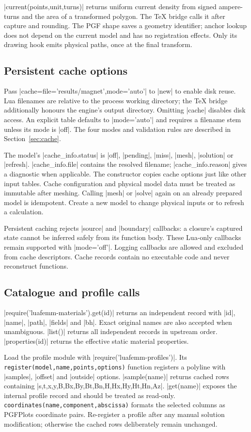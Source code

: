 |current(points,unit,turns)| returns uniform current density from signed
ampere-turns and the area of a transformed polygon. The TeX bridge calls it
after capture and rounding. The PGF shape saves a geometry identifier; anchor
lookup does not depend on the current model and has no registration effects.
Only its drawing hook emits physical paths, once at the final transform.

\subsection{Persistent cache options}
Pass |cache={file='results/magnet',mode='auto'}| to |new| to enable disk
reuse. Lua filenames are relative to the process working directory; the
TeX bridge additionally honours the engine's output directory.
Omitting |cache| disables disk access. An explicit table defaults to
|mode='auto'| and requires a filename stem unless its mode is |off|.
The four modes and validation rules are described in Section~\ref{sec:cache}.

The model's |cache_info.status| is |off|, |pending|, |miss|, |mesh|,
|solution| or |refresh|. |cache_info.file| contains the resolved filename;
|cache_info.reason| gives a diagnostic when applicable. The constructor
copies cache options just like other input tables. Cache configuration
and physical model data must be treated as immutable after meshing.
Calling |mesh| or |solve| again on an already prepared model is idempotent.
Create a new model to change physical inputs or to refresh a calculation.

Persistent caching rejects |source| and |boundary| callbacks: a closure's
captured state cannot be inferred safely from its function body. These
Lua-only callbacks remain supported with |mode='off'|. Logging callbacks
are allowed and excluded from cache descriptors. Cache records contain
no executable code and never reconstruct functions.

\subsection{Catalogue and profile calls}
|require('luafemm-materials').get(id)| returns an independent record with
|id|, |name|, |path|, |fields| and |bh|. Exact original names are also accepted
when unambiguous. |list()| returns all independent records in upstream
order. |properties(id)| returns the effective static material properties.

Load the profile module with |require('luafemm-profiles')|. Its
\nolinkurl{register(model,name,points,options)} function registers a polyline with |samples|,
|offset| and |outside| options. |sample(name)| returns cached rows containing
|s,t,x,y,B,Bx,By,Bt,Bn,H,Hx,Hy,Ht,Hn,Az|. |get(name)| exposes the internal
profile record and should be treated as read-only. \nolinkurl{coordinates(name,component,abscissa)}
formats the selected columns as PGFPlots coordinate pairs. Re-register
a profile after any manual solution modification; otherwise the cached
rows deliberately remain unchanged.

